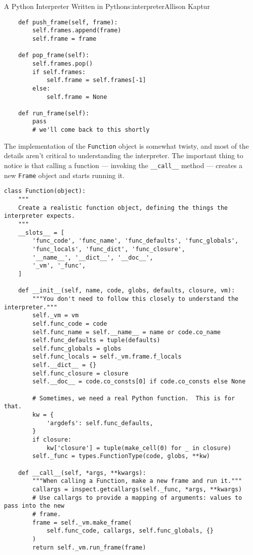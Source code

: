 \begin{aosachapter}{A Python Interpreter Written in Python}{s:interpreter}{Allison Kaptur}
\begin{verbatim}
    def push_frame(self, frame):
        self.frames.append(frame)
        self.frame = frame

    def pop_frame(self):
        self.frames.pop()
        if self.frames:
            self.frame = self.frames[-1]
        else:
            self.frame = None

    def run_frame(self):
        pass
        # we'll come back to this shortly
\end{verbatim}

\label{the-function-class}

The implementation of the \texttt{Function} object is somewhat twisty,
and most of the details aren't critical to understanding the
interpreter. The important thing to notice is that calling a function
--- invoking the \texttt{\_\_call\_\_} method --- creates a new
\texttt{Frame} object and starts running it.

\begin{verbatim}
class Function(object):
    """
    Create a realistic function object, defining the things the interpreter expects.
    """
    __slots__ = [
        'func_code', 'func_name', 'func_defaults', 'func_globals',
        'func_locals', 'func_dict', 'func_closure',
        '__name__', '__dict__', '__doc__',
        '_vm', '_func',
    ]

    def __init__(self, name, code, globs, defaults, closure, vm):
        """You don't need to follow this closely to understand the interpreter."""
        self._vm = vm
        self.func_code = code
        self.func_name = self.__name__ = name or code.co_name
        self.func_defaults = tuple(defaults)
        self.func_globals = globs
        self.func_locals = self._vm.frame.f_locals
        self.__dict__ = {}
        self.func_closure = closure
        self.__doc__ = code.co_consts[0] if code.co_consts else None

        # Sometimes, we need a real Python function.  This is for that.
        kw = {
            'argdefs': self.func_defaults,
        }
        if closure:
            kw['closure'] = tuple(make_cell(0) for _ in closure)
        self._func = types.FunctionType(code, globs, **kw)

    def __call__(self, *args, **kwargs):
        """When calling a Function, make a new frame and run it."""
        callargs = inspect.getcallargs(self._func, *args, **kwargs)
        # Use callargs to provide a mapping of arguments: values to pass into the new 
        # frame.
        frame = self._vm.make_frame(
            self.func_code, callargs, self.func_globals, {}
        )
        return self._vm.run_frame(frame)


\end{verbatim}
\end{aosachapter}
